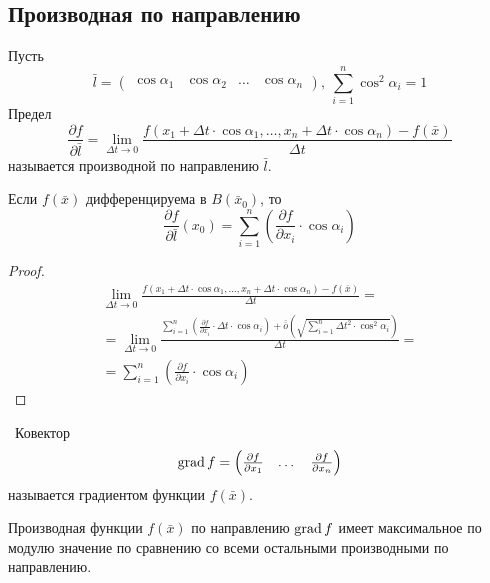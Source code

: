 \subsection{Производная по направлению}
\begin{definition}
    Пусть
    \[\bar{l}=\begin{pmatrix}
        \cos{\alpha_1} & \cos{\alpha_2} & \dots & \cos{\alpha_n}
    \end{pmatrix},\
    \sum\limits_{i=1}^{n}\cos^2{\alpha_i}=1
    \]
    Предел
    \[\frac{\partial {f}}{\partial {\bar{l}}}=\lim\limits_{\Delta t\to 0}\frac{f(x_1+\Delta t \cdot \cos{\alpha_1},\dots,x_n+\Delta t \cdot \cos{\alpha_n})-f(\bar{x})}{\Delta t}\]
    называется производной по направлению $\bar{l}$.
\end{definition} 
\begin{theorem}
    Если $f(\bar{x})$ дифференцируема в $B(\bar{x}_0)$, то
    \[\frac{\partial {f}}{\partial {\bar{l}}}(x_0)=\sum\limits_{i=1}^{n}\left(\frac{\partial {f}}{\partial {x_i}}\cdot \cos{\alpha_i}\right)\]
\end{theorem} 
\begin{proof}
    \begin{multline*}
        \lim\limits_{\Delta t\to 0}\frac{f(x_1+\Delta t \cdot \cos{\alpha_1},\dots,x_n+\Delta t \cdot \cos{\alpha_n})-f(\bar{x})}{\Delta t}=\\
        =\lim\limits_{\Delta t\to 0}\frac{\sum\limits_{i=1}^{n}\left(\frac{\partial {f}}{\partial {x_i}}\cdot \Delta t\cdot \cos{\alpha_i}\right)+\bar{\bar{o}}{\left(\sqrt{\sum\limits_{i=1}^{n}\Delta t^2\cdot \cos^2{\alpha_i}}\right)}}{\Delta t}=\\
        =\sum\limits_{i=1}^{n}\left( \frac{\partial {f}}{\partial {x_i}}\cdot \cos{\alpha_i}\right)
    \end{multline*}
\end{proof}
\begin{definition}\
    Ковектор
    \[
    \operatorname*{grad}{f}=\begin{pmatrix}
        \frac{\partial {f}}{\partial {x_1}} & \dots & \frac{\partial {f}}{\partial {x_n}}
    \end{pmatrix}
    \]
    называется градиентом функции $f(\bar{x})$.
\end{definition} 
\begin{theorem}
    Производная функции $f(\bar{x})$ по направлению $\operatorname*{grad}{f}$ имеет максимальное по модулю значение по сравнению со всеми остальными производными по направлению.
\end{theorem} 
